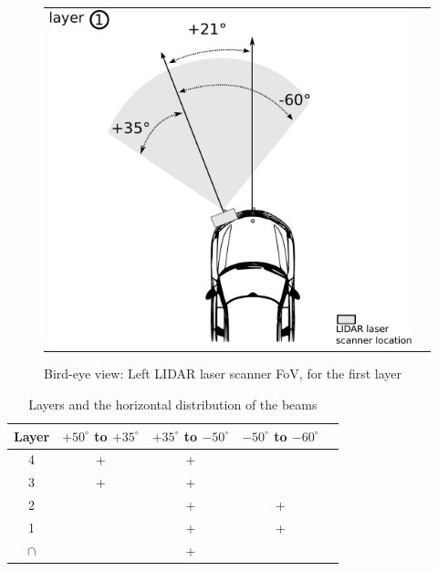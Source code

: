 \begin{figure}[h]
   \centering
     \begin{tabular}{lr}
       \includegraphics[scale=0.5]{img/fig:demonstrator:superior}
     \end{tabular}
   \caption{Bird-eye view: Left LIDAR laser scanner FoV, for the first layer}
   \label{fig:demonstrator:superior}
\end{figure}


\begin{table}
	\begin{center}
	    \begin{tabular}{ | c | c | c | c | c |}
		    \hline
		    Layer & $+50^\circ$ to $+35^\circ$ & $+35^\circ$ to $-50^\circ$ & $-50^\circ$ to $-60^\circ$ \\ \hline
		    4 & + & + &    \\ \hline
		    3 & + & + &    \\ \hline
		    2 &  & + & + \\ \hline
		    1 &  & + & + \\ \hline
		    $\cap$ &  & + &   \\ \hline
	    \end{tabular}
	\end{center}
    \caption{Layers and the horizontal distribution of the beams}
\label{tab:beam:interception}
\end{table}

